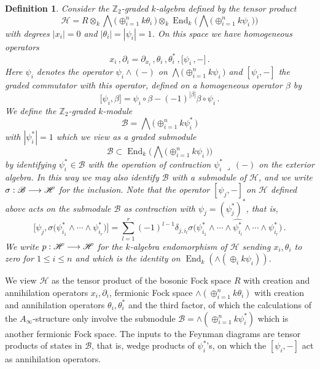 \documentclass[english,letter paper,12pt,leqno]{article}
\theoremstyle{example}
\newtheorem{definition}[theorem]{Definition}
\numberwithin{equation}{section}
\def\be{\begin{equation}}
\def\ee{\end{equation}}
\def\nZ{\mathds{Z}}
\DeclareMathOperator{\End}{End}
\begin{document}
\begin{definition}\label{defn:handop} Consider the $\nZ_2$-graded $k$-algebra defined by the tensor product
\be
\mathscr{H} = R \otimes_k \bigwedge\big( \oplus_{i=1}^n k \theta_i \,\big) \otimes_k \End_k\Big( \bigwedge\big( \oplus_{i=1}^n k \psi_i \, \big) \Big)
\ee
with degrees $|x_i| = 0$ and $|\theta_i| = |\psi_i| = 1$. On this space we have homogeneous operators
\be
x_i\,, \partial_i = \partial_{x_i}\,, \theta_i\,, \theta_i^*\,, \big[\psi_i\,,-\big]\,.
\ee
Here $\psi_i$ denotes the operator $\psi_i \wedge (-)$ on $\bigwedge\big( \oplus_{i=1}^n k \psi_i \, \big)$ and $[ \psi_i, - ]$ the graded commutator with this operator, defined on a homogeneous operator $\beta$ by
\[
\big[ \psi_i, \beta \big] = \psi_i \circ \beta - (-1)^{|\beta|} \beta \circ \psi_i\,.
\]
We define the $\nZ_2$-graded $k$-module
\be\label{defn:B}
\mathscr{B} = \bigwedge\big( \oplus_{i=1}^n k \psi_i^* \,\big)
\ee
with $|\psi_i^*| = 1$ which we view as a graded submodule
\[
\mathscr{B} \subset \End_k\Big( \bigwedge\big( \oplus_{i=1}^n k \psi_i \, \big) \Big)
\]
by identifying $\psi_i^* \in \mathscr{B}$ with the operation of contraction $\psi_i^*\, \lrcorner\, (-)$ on the exterior algebra. In this way we may also identify $\mathscr{B}$ with a submodule of $\mathscr{H}$, and we write $\sigma: \mathscr{B} \longrightarrow \mathscr{H}$ for the inclusion. Note that the operator $[\psi_j, -]$ on $\mathscr{H}$ defined above acts on the submodule $\mathscr{B}$ as contraction with $\psi_j = (\psi_j^*)^*$, that is,
\be\label{eq:comm_is_ann}
\Big[ \psi_j, \sigma\big(\psi_{i_1}^* \wedge \cdots \wedge \psi_{i_r}^*\big) \Big] = \sum_{l=1}^r (-1)^{l-1} \delta_{j, i_l} \sigma\big(\psi_{i_1}^* \wedge \cdots \wedge \widehat{ \psi_{i_l}^* } \wedge \cdots \wedge \psi_{i_r}^*\big)\,.
\ee
We write $p: \mathscr{H} \longrightarrow \mathscr{H}$ for the $k$-algebra endomorphism of $\mathscr{H}$ sending $x_i, \theta_i$ to zero for $1 \le i \le n$ and which is the identity on $\End_k( \wedge( \oplus_i k\psi_i ) )$.
\end{definition}

We view $\mathscr{H}$ as the tensor product of the bosonic Fock space $R$ with creation and annihilation operators $x_i, \partial_i$, fermionic Fock space $\wedge( \oplus_{i=1}^n k \theta_i )$ with creation and annihilation operators $\theta_i, \theta_i^*$ and the third factor, of which the calculations of the $A_\infty$-structure only involve the submodule $\mathscr{B} = \wedge( \oplus_{i=1}^n k \psi_i^* )$ which is another fermionic Fock space. The inputs to the Feynman diagrams are tensor products of states in $\mathscr{B}$, that is, wedge products of $\psi_i^*$'s, on which the $[\psi_i, -]$ act as annihilation operators.
\end{document}
